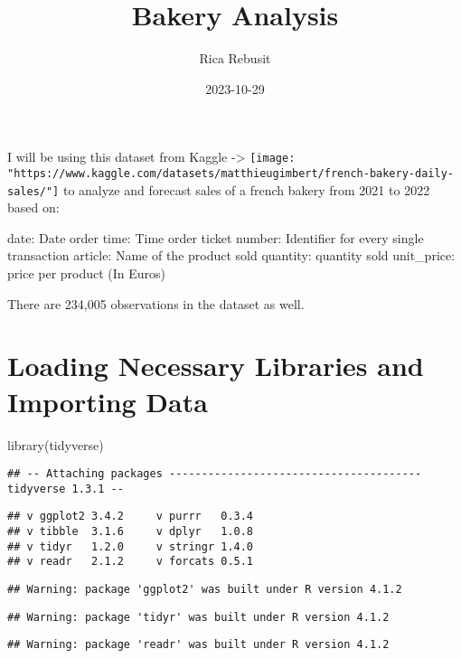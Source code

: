 \documentclass[
]{article}
\title{Bakery Analysis}
\author{Rica Rebusit}
\date{2023-10-29}
\newenvironment{Shaded}{\begin{snugshade}}{\end{snugshade}}
\newcommand{\FunctionTok}[1]{\textcolor[rgb]{0.00,0.00,0.00}{#1}}
\newcommand{\NormalTok}[1]{#1}
\begin{document}
\maketitle

I will be using this dataset from Kaggle -\textgreater{}
\texttt{[image: "https://www.kaggle.com/datasets/matthieugimbert/french-bakery-daily-sales/"]}
to analyze and forecast sales of a french bakery from 2021 to 2022 based
on:

date: Date order time: Time order ticket number: Identifier for every
single transaction article: Name of the product sold quantity: quantity
sold unit\_price: price per product (In Euros)

There are 234,005 observations in the dataset as well.

\hypertarget{loading-necessary-libraries-and-importing-data}{%
\section{Loading Necessary Libraries and Importing
Data}\label{loading-necessary-libraries-and-importing-data}}

\begin{Shaded}
\begin{Highlighting}[]
\FunctionTok{library}\NormalTok{(tidyverse)}
\end{Highlighting}
\end{Shaded}

\begin{verbatim}
## -- Attaching packages --------------------------------------- tidyverse 1.3.1 --
\end{verbatim}

\begin{verbatim}
## v ggplot2 3.4.2     v purrr   0.3.4
## v tibble  3.1.6     v dplyr   1.0.8
## v tidyr   1.2.0     v stringr 1.4.0
## v readr   2.1.2     v forcats 0.5.1
\end{verbatim}

\begin{verbatim}
## Warning: package 'ggplot2' was built under R version 4.1.2
\end{verbatim}

\begin{verbatim}
## Warning: package 'tidyr' was built under R version 4.1.2
\end{verbatim}

\begin{verbatim}
## Warning: package 'readr' was built under R version 4.1.2
\end{verbatim}
\end{document}
